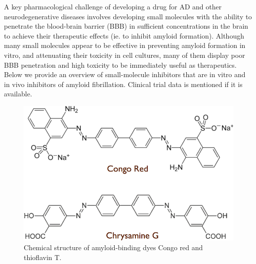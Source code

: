 A key pharmacological challenge of developing a drug for AD and other neurodegenerative diseases involves developing small molecules with the ability to penetrate the blood-brain barrier (BBB) in sufficient concentrations in the brain to achieve their therapeutic effects (ie. to inhibit amyloid formation).\cite{Hawkes:2009gu,Hubbard:2011fs} Although many small molecules appear to be effective in preventing amyloid formation in vitro, and attenuating their toxicity in cell cultures, many of them display poor BBB penetration and high toxicity to be immediately useful as therapeutics.
Below we provide an overview of small-molecule inhibitors that are in vitro and in vivo inhibitors of amyloid fibrillation.  Clinical trial data is mentioned if it is available.

\begin{figure}
\centering
\includegraphics[width=4.5in]{figures/introduction/dyes.pdf}
\caption[Amyloid-binding dyes]{Chemical structure of amyloid-binding dyes Congo red and thioflavin T.}
\label{fig:amyloid_dyes}
\end{figure}


